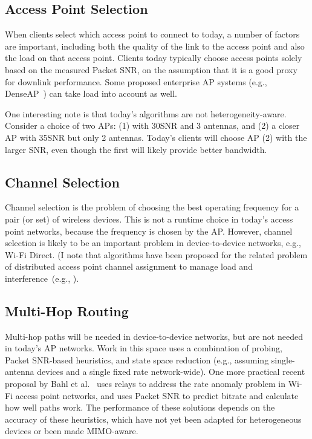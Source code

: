 \subsection{Access Point Selection}
When clients select which access point to connect to today, a number of factors are important, including both the quality of the link to the access point and also the load on that access point. Clients today typically choose access points solely based on the measured Packet SNR, on the assumption that it is a good proxy for downlink performance. Some proposed enterprise AP systems (e.g., DenseAP~\cite{Murty_DenseAP}) can take load into account as well.

One interesting note is that today's algorithms are not heterogeneity-aware. Consider a choice of two APs: (1) with 30\dB SNR and 3 antennas, and (2) a closer AP with 35\dB SNR but only 2 antennas. Today's clients will choose AP (2) with the larger SNR, even though the first will likely provide better bandwidth.

\subsection{Channel Selection}
Channel selection is the problem of choosing the best operating frequency for a pair (or set) of wireless devices. This is not a runtime choice in today's access point networks, because the frequency is chosen by the AP. However, channel selection is likely to be an important problem in device-to-device networks, e.g., Wi-Fi Direct. (I note that algorithms have been proposed for the related problem of distributed access point channel assignment to manage load and interference~(e.g., \cite{Akella_Chan}).

\subsection{Multi-Hop Routing}
Multi-hop paths will be needed in device-to-device networks, but are not needed in today's AP networks. Work in this space uses a combination of probing, Packet SNR-based heuristics, and state space reduction (e.g., assuming single-antenna devices and a single fixed rate network-wide). One more practical recent proposal by Bahl et al.~\cite{Bahl_repeater} uses relays to address the rate anomaly problem in Wi-Fi access point networks, and uses Packet SNR to predict bitrate and calculate how well paths work. The performance of these solutions depends on the accuracy of these heuristics, which have not yet been adapted for heterogeneous devices or been made MIMO-aware.

